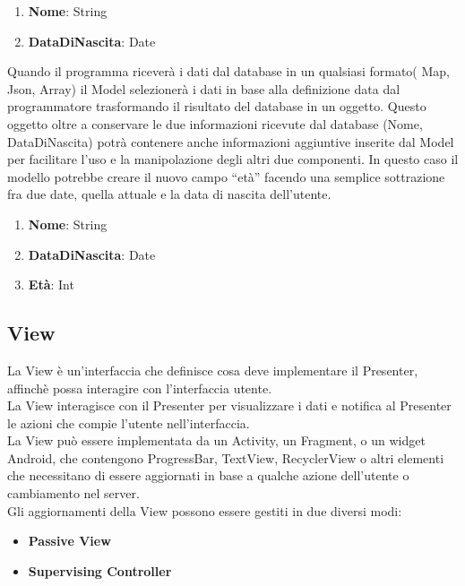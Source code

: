   \begin{enumerate}
   \item \textbf{Nome}: String
   \item \textbf{DataDiNascita}: Date
   \end{enumerate}

Quando il programma riceverà i dati dal database in un qualsiasi formato( Map, Json, Array) il Model selezionerà i dati in base alla definizione data dal programmatore trasformando il risultato del database in un oggetto. Questo oggetto oltre a conservare le due informazioni ricevute dal database (Nome, DataDiNascita) potrà contenere anche informazioni aggiuntive inserite dal Model per facilitare l'uso e la manipolazione degli altri due componenti.
In questo caso il modello potrebbe creare il nuovo campo ``età'' facendo una semplice sottrazione fra due date, quella attuale e la data di nascita dell'utente.

   \begin{enumerate}
   \item \textbf{Nome}: String
   \item \textbf{DataDiNascita}: Date
   \item \textbf{Età}: Int
   \end{enumerate}


   \subsection{View}
   La View è un'interfaccia che definisce cosa deve implementare il Presenter, affinchè possa interagire con l'interfaccia utente.\\
   La View interagisce con il Presenter per visualizzare i dati e notifica al Presenter le azioni che compie l'utente nell'interfaccia.\\
   La View può essere implementata da un Activity, un Fragment, o un widget Android, che contengono ProgressBar, TextView, RecyclerView o altri elementi che necessitano di essere aggiornati in base a qualche azione dell'utente o cambiamento nel server.\\
   Gli aggiornamenti della View possono essere gestiti in due diversi modi:
   \begin{itemize}
       \item \textbf{Passive View}
       \item \textbf{Supervising Controller}
   \end{itemize}


